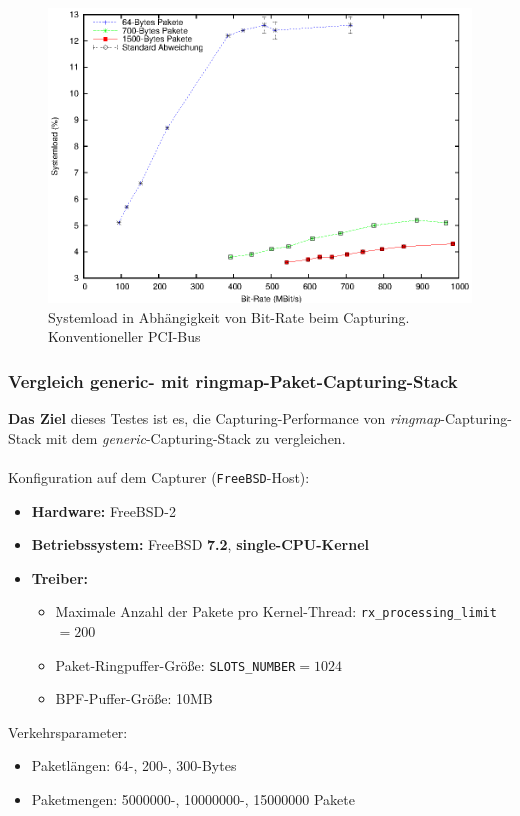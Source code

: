 \begin{figure} 
\centering \includegraphics[width=5.5in]{plots/graphs/sysload_PCI_mbs.eps}
\caption{Systemload in Abhängigkeit von Bit-Rate beim Capturing. Konventioneller PCI-Bus}
\label{img:plot_sysload_pci_mbs}
\end{figure}

\subsubsection{Vergleich generic- mit ringmap-Paket-Capturing-Stack}\label{sec:erg_verg}
\textbf{Das Ziel} dieses Testes ist es, die Capturing-Performance von 
\emph{ringmap}-Capturing-Stack mit dem \emph{generic}-Capturing-Stack
zu vergleichen.\\\\
%
Konfiguration auf dem Capturer (\verb+FreeBSD+-Host): 
\begin{itemize}
	\item \textbf{Hardware:} FreeBSD-2 
	\item \textbf{Betriebssystem:} FreeBSD \textbf{7.2}, \textbf{single-CPU-Kernel}
	\item \textbf{Treiber:} 
		\begin{itemize}
			\item Maximale Anzahl der Pakete pro Kernel-Thread: \verb+rx_processing_limit+$=200$
			\item Paket-Ringpuffer-Größe: \verb+SLOTS_NUMBER+$=1024$
			\item BPF-Puffer-Größe: 10MB
		\end{itemize}
\end{itemize}
Verkehrsparameter:
\begin{itemize}
	\item Paketlängen: 64-, 200-, 300-Bytes
	\item Paketmengen: 5000000-, 10000000-, 15000000 Pakete 
\end{itemize}


